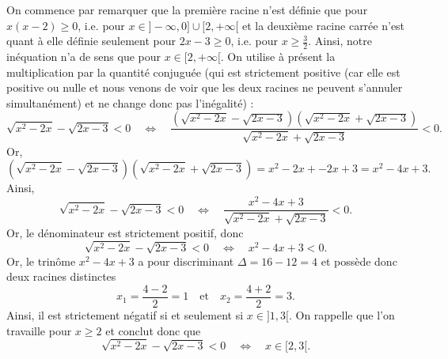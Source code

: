 On commence par remarquer que la première racine n'est définie que pour $x(x-2) \geqslant 0$, i.e. pour $x \in ]- \infty,0]\cup [2,+\infty[$ et la deuxième racine carrée n'est quant à elle définie seulement pour $2x - 3 \geqslant 0$, i.e. pour $x \geqslant \frac{3}{2}$. Ainsi, notre inéquation n'a de sens que pour $x \in [2,+\infty[$. On utilise à présent la multiplication par la quantité conjuguée (qui est strictement positive (car elle est positive ou nulle et nous venons de voir que les deux racines ne peuvent s'annuler simultanément) et ne change donc pas l'inégalité) :
\[\sqrt{x^2 - 2x} - \sqrt{2x-3} < 0 \quad \Leftrightarrow \quad \frac{(\sqrt{x^2 - 2x} - \sqrt{2x-3})(\sqrt{x^2 - 2x} + \sqrt{2x-3})}{\sqrt{x^2 - 2x} + \sqrt{2x-3}} < 0.\]
Or,
\[ (\sqrt{x^2 - 2x} - \sqrt{2x-3})(\sqrt{x^2 - 2x} + \sqrt{2x-3}) = x^2 - 2x + -2x + 3 = x^2 - 4x + 3.\]
Ainsi,
\[\sqrt{x^2 - 2x} - \sqrt{2x-3} < 0 \quad \Leftrightarrow \quad \frac{x^2 - 4x + 3}{\sqrt{x^2 - 2x} + \sqrt{2x-3}} < 0.\]
Or, le dénominateur est strictement positif, donc
\[\sqrt{x^2 - 2x} - \sqrt{2x-3} < 0 \quad \Leftrightarrow \quad x^2 - 4x + 3 < 0.\]
Or, le trinôme $x^2 - 4x + 3$ a pour discriminant $\Delta = 16 - 12 =4$ et possède donc deux racines distinctes
\[x_1 = \frac{4 - 2}{2} = 1 \quad \text{et} \quad x_2 = \frac{4 + 2}{2} = 3.\]
Ainsi, il est strictement négatif si et seulement si $x \in ]1,3[$. On rappelle que l'on travaille pour $x \geqslant 2$ et conclut donc que
\[\sqrt{x^2 - 2x} - \sqrt{2x-3} < 0 \quad \Leftrightarrow \quad x \in [2,3[.\]